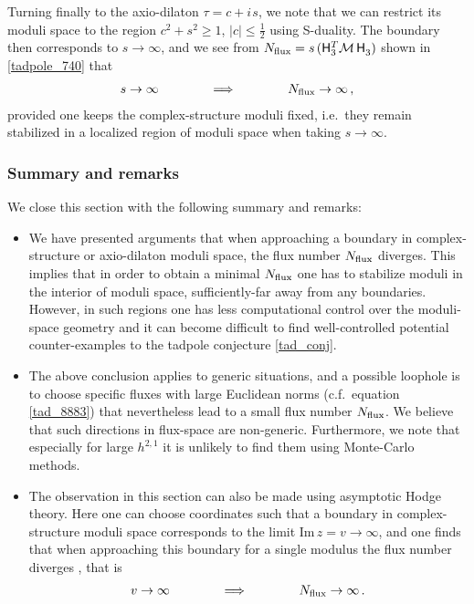 \documentclass[12pt,a4paper]{article}
\newcommand{\eq}[1]{\begin{equation}
                     \begin{split} #1 \end{split}
                     \end{equation}}
\newcommand{\op}{\hspace{1pt}}
\numberwithin{equation}{section}
\begin{document}
Turning finally to the axio-dilaton $\tau=c+i\op s$, we note that we can restrict its moduli space to the region 
$c^2 + s^2 \geq 1$, $\lvert c\rvert \leq \tfrac{1}{2}$ using S-duality. The boundary then corresponds to $s\to\infty$, 
and we see from 
$N_{\rm flux} =  s\,( \mathsf H_3^T \mathcal M\, \mathsf H_3^{\vphantom{T}})$
shown in \eqref{tadpole_740} that 
\eq{
    s \to \infty \hspace{40pt}\Longrightarrow \hspace{40pt}
    N_{\rm flux} \to  \infty\,,
}
provided one keeps the complex-structure moduli fixed, i.e.~they remain stabilized 
in a localized region of moduli space when taking $s\to\infty$. 





\subsubsection*{Summary and remarks}


We close this section with the following summary and remarks:
\begin{itemize}

\item We have presented arguments that when approaching a boundary in complex-structure 
or axio-dilaton moduli space, the flux number $N_{\rm flux}$ diverges. 
This implies that in order to obtain a minimal $N_{\rm flux}$ one has to stabilize moduli in the 
interior of moduli space, sufficiently-far away from any boundaries.
However, in such regions one  has less computational control over 
the moduli-space geometry and 
it can  become difficult to find well-controlled potential
counter-examples to the tadpole conjecture \eqref{tad_conj}. 


\item The above conclusion applies to generic situations, and
a possible loophole is to choose specific fluxes with large Euclidean norms
(c.f.~equation \eqref{tad_8883}) that nevertheless lead to a small 
flux number $N_{\rm flux}$.  
We believe that such directions in flux-space are non-generic. Furthermore, 
we note that especially for large $h^{2,1}$ it is unlikely 
to find them using Monte-Carlo methods. 




\item The observation in this section can also be made using asymptotic Hodge theory. 
Here one can choose coordinates such that 
a boundary in complex-structure moduli space corresponds to 
the limit $\mbox{Im}\, z = v \to \infty$, and one finds that when approaching 
this  boundary for a single modulus the flux number diverges \cite{Schmid,CKS,Grimm:2020cda}, that is
\eq{
  \label{tad_9375}
  v\to \infty \hspace{40pt}\Longrightarrow \hspace{40pt}
    N_{\rm flux} \to  \infty\,.
}




\end{itemize}
\end{document}
